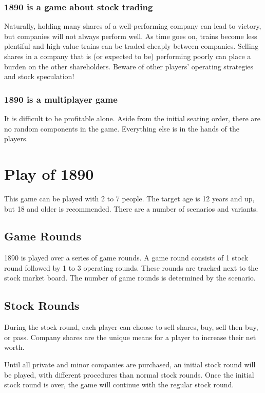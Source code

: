 \documentclass{article}
\begin{document}
\begin{CJK}{UTF8}{min}
\begin{multicols}{2}
\subsubsection*{1890 is a game about stock trading}
Naturally, holding many shares of a well-performing company can lead
to victory, but companies will not always perform well. As time goes
on, trains become less plentiful and high-value trains can be traded
cheaply between companies. Selling shares in a company that is (or
expected to be) performing poorly can place a burden on the other
shareholders. Beware of other players' operating strategies and stock
speculation!

\subsubsection*{1890 is a multiplayer game}
It is difficult to be profitable alone. Aside from the initial seating
order, there are no random components in the game. Everything else is
in the hands of the players.

\section{Play of 1890}
This game can be played with 2 to 7 people. The target age is 12 years
and up, but 18 and older is recommended. There are a number of
scenarios and variants.

\subsection{Game Rounds}
1890 is played over a series of game rounds. A game round consists of
1 stock round followed by 1 to 3 operating rounds. These rounds are
tracked next to the stock market board. The number of game rounds is
determined by the scenario.

\subsection{Stock Rounds}
During the stock round, each player can choose to sell
shares, buy, sell then buy, or pass. Company shares are the unique
means for a player to increase their net worth.

Until all private and minor companies are purchased, an initial stock
round will be played, with different procedures than normal stock
rounds. Once the initial stock round is over, the game will continue with
the regular stock round.


\end{multicols}
\end{CJK}
\end{document}
